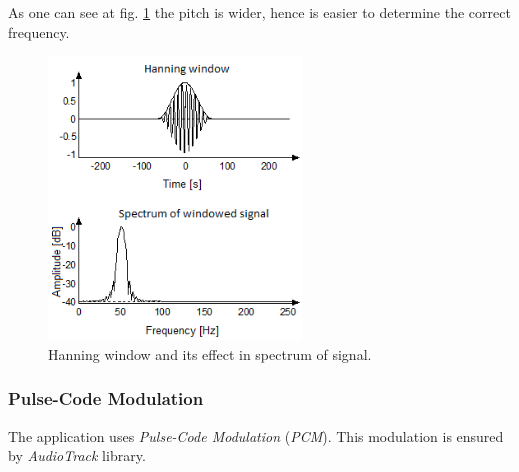 \documentclass[11pt,titlepage]{article}
\theoremstyle{plain}
\begin{document}
As one can see at fig. \ref{fig:F10} the pitch is wider, hence is easier to determine the correct frequency.
\begin{figure}[H]
	\centering
	\includegraphics[width=0.6\textwidth]{img/hanning_window}
	\caption{Hanning window and its effect in spectrum of signal.}
	\label{fig:F10}
\end{figure}

\subsubsection{Pulse-Code Modulation}
The application uses \textit{Pulse-Code Modulation} (\textit{PCM}). This modulation is ensured by \textit{AudioTrack} library.

\vspace{5mm}
\end{document}
